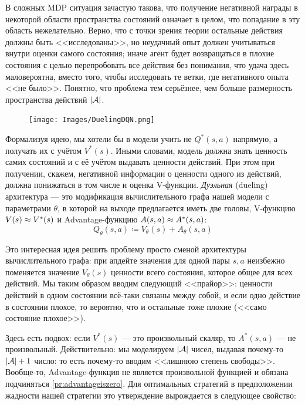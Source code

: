 В сложных MDP ситуация зачастую такова, что получение негативной награды в некоторой области пространства состояний означает в целом, что попадание в эту область нежелательно. Верно, что с точки зрения теории остальные действия должны быть <<исследованы>>, но неудачный опыт должен учитываться внутри оценки самого состояния; иначе агент будет возвращаться в плохие состояния с целью перепробовать все действия без понимания, что удача здесь маловероятна, вместо того, чтобы исследовать те ветки, где негативного опыта <<не было>>. Понятно, что проблема тем серьёзнее, чем больше размерность пространства действий $|\mathcal{A}|$.

\begin{figure}
\vspace{-0.5cm}
\centering
\texttt{[image: Images/DuelingDQN.png]}
\vspace{-0.5cm}
\end{figure}

Формализуя идею, мы хотели бы в модели учить не $Q^*(s, a)$ напрямую, а получать их с учётом $V^*(s)$. Иными словами, модель должна знать ценность самих состояний и с её учётом выдавать ценности действий. При этом при получении, скажем, негативной информации о ценности одного из действий, должна понижаться в том числе и оценка V-функции. \emph{Дуэльная} (dueling) архитектура --- это модификация вычислительного графа нашей модели с параметрами $\theta$, в которой на выходе предлагается иметь две головы, V-функцию $V(s) \HM \approx V^*(s)$ и Advantage-функцию $A(s, a) \HM \approx A^*(s, a)$: 
\begin{equation}\label{naivedueling}
Q_{\theta}(s, a) \coloneqq V_{\theta}(s) + A_{\theta}(s, a)
\end{equation}

Это интересная идея решить проблему просто сменой архитектуры вычислительного графа: при апдейте значения для одной пары $s, a$ неизбежно поменяется значение $V_{\theta}(s)$ ценности всего состояния, которое общее для всех действий. Мы таким образом вводим следующий <<прайор>>: ценности действий в одном состоянии всё-таки связаны между собой, и если одно действие в состоянии плохое, то вероятно, что и остальные тоже плохие (<<само состояние плохое>>).  

Здесь есть подвох: если $V^*(s)$ --- это произвольный скаляр, то $A^*(s, a)$ --- не произвольный. Действительно: мы моделируем $|\mathcal{A}|$ чисел, выдавая почему-то $|\A| \HM+ 1$ число: то есть почему-то вводим <<лишнюю степень свободы>>. Вообще-то, Advantage-функция не является произвольной функцией и обязана подчиняться \eqref{pr:advantageiszero}. Для оптимальных стратегий в предположении жадности нашей стратегии это утверждение вырождается в следующее свойство:

